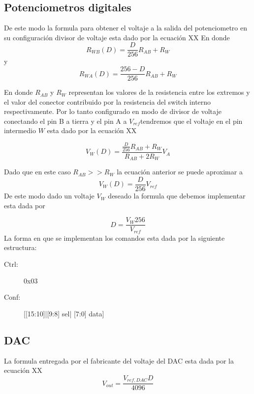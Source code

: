 \subsection{Potenciometros digitales}
De este modo la formula para obtener el voltaje a la salida del potenciometro en su configuración divisor de voltaje esta dado por la ecuación XX
En donde 
\begin{equation}
R_{WB}(D)=\frac{D}{256}R_{AB} + R_W
\end{equation}
y
\begin{equation}
R_{WA}(D)=\frac{256-D}{256}R_{AB} + R_W
\end{equation}

En donde $R_{AB}$ y $R_W$ representan los valores de la resistencia entre los extremos y el valor del conector contribuido por la resistencia del switch interno respectivamente.
Por lo tanto configurado en modo de divisor de voltaje conectando el pin B a tierra y el pin A a $V_{ref}$tendremos que el voltaje en el pin intermedio $W$ esta dado por la ecuación XX

\begin{equation}
V_{W}(D)= \frac{\frac{D}{256}R_{AB}+R_W}{R_{AB}+2R_W}V_A
\end{equation}

Dado que en este caso  $R_{AB} >> R_W$ la ecuación anterior se puede aproximar a 
\begin{equation}
V_{W}(D)=\frac{D}{256}V_{ref}
\end{equation}
De este modo dado un voltaje $V_W$ deseado la formula que debemos implementar esta dada por 

\begin{equation}
D= \frac{V_W 256}{V_{ref}}
\end{equation}
La forma en que se implementan los comandos esta dada por la siguiente estructura:
\begin{description}
\item[Ctrl:] 0x03
\item[Conf:][[15:10]|[9:8] sel| [7:0] data]
\end{description}

\subsection{DAC}
La formula entregada por el fabricante del voltaje del DAC esta dada por la ecuación XX
\begin{equation}
V_{out} =\frac{V_{ref,DAC}D}{4096}
\end{equation}


